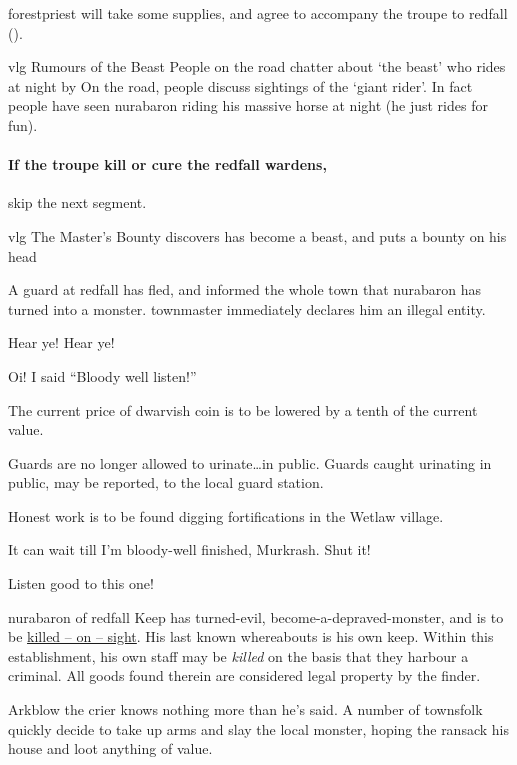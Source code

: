 \Gls{forestpriest} will take some supplies, and agree to accompany the troupe to \gls{redfall} ().

{\gls{vlg} Rumours of the Beast}%
{People on the road chatter about `the beast' who rides at night by }%
On the road, people discuss sightings of the `giant rider'.
In fact people have seen \gls{nurabaron} riding his massive horse at night (he just rides for fun).

\paragraph{If the troupe kill or cure the \gls{redfall} \glspl{warden},}
skip the next \gls{segment}.

{\gls{vlg} The Master's Bounty}%
{ discovers  has become a beast, and puts a bounty on his head}%
\label{mastersBounty}

A guard at \gls{redfall} has fled, and informed the whole town that \gls{nurabaron} has turned into a monster.
\Gls{townmaster} immediately declares him an illegal entity.

\begin{speechtext}
    Hear ye! Hear ye!

    Oi! I said ``Bloody well listen!''

    The current price of dwarvish coin is to be lowered by a tenth of the current value.

    Guards are no longer allowed to urinate\ldots in public.
    Guards caught urinating in public, may be reported, to the local {\footnotesize guard station}.

    Honest work is to be found digging fortifications in the Wetlaw \gls{village}.

    It can wait till I'm bloody-well finished, Murkrash.
    Shut it!

    Listen good to this one!

    \Gls{nurabaron} of \gls{redfall} Keep has turned-evil, become-a-depraved-monster, and is to be \underline{\large killed -- on -- sight}.
    His last known whereabouts is his own keep.
    Within this establishment, his own staff may be \emph{killed} on the basis that they harbour a criminal.
    All goods found therein are considered legal property by the finder.
\end{speechtext}

Arkblow the crier knows nothing more than he's said.  A number of townsfolk quickly decide to take up arms and slay the local monster, hoping the ransack his house and loot anything of value.

